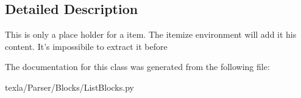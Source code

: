 \subsection{Detailed Description}
\begin{DoxyVerb}This is only a place holder for a item.
The itemize environment will add it his content.
It's impossibile to extract it before\end{DoxyVerb}
 

The documentation for this class was generated from the following file\+:\begin{DoxyCompactItemize}
\item 
texla/\+Parser/\+Blocks/List\+Blocks.\+py\end{DoxyCompactItemize}
